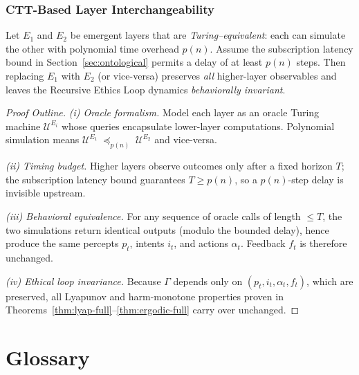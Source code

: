 \subsubsection{CTT-Based Layer Interchangeability}
\label{app:ctt-full}

\begin{theorem}
\label{thm:ctt}
Let $E_1$ and $E_2$ be emergent layers that are \emph{Turing–equivalent}:
each can simulate the other with polynomial time overhead $p(n)$.
Assume the subscription latency bound in Section~\ref{sec:ontological}
permits a delay of at least $p(n)$ steps.
Then replacing $E_1$ with $E_2$ (or vice-versa)
preserves \emph{all} higher-layer observables and leaves the
Recursive Ethics Loop dynamics \emph{behaviorally invariant}.
\end{theorem}

\begin{proof}[Proof Outline]
\emph{(i)  Oracle formalism.}
Model each layer as an oracle Turing machine
$\mathcal{U}^{E_i}$ whose queries encapsulate lower-layer computations.
Polynomial simulation means
$\mathcal{U}^{E_1}\;\preccurlyeq_{p(n)}\;\mathcal{U}^{E_2}$
and vice-versa.

\smallskip\noindent
\emph{(ii)  Timing budget.}
Higher layers observe outcomes only after a fixed horizon $T$;
the subscription latency bound guarantees $T\!\ge\!p(n)$,
so a $p(n)$-step delay is invisible upstream.

\smallskip\noindent
\emph{(iii)  Behavioral equivalence.}
For any sequence of oracle calls of length $\le T$,
the two simulations return identical outputs
(modulo the bounded delay), hence produce the same
percepts $p_t$, intents $i_t$, and actions $\alpha_t$.
Feedback $f_t$ is therefore unchanged.

\smallskip\noindent
\emph{(iv)  Ethical loop invariance.}
Because $\Gamma$ depends only on
$(p_t,i_t,\alpha_t,f_t)$, which are preserved,
all Lyapunov and harm-monotone properties proven
in Theorems~\ref{thm:lyap-full}--\ref{thm:ergodic-full} carry over unchanged.
\end{proof}


\section*{Glossary}
\label{app:glossary}

